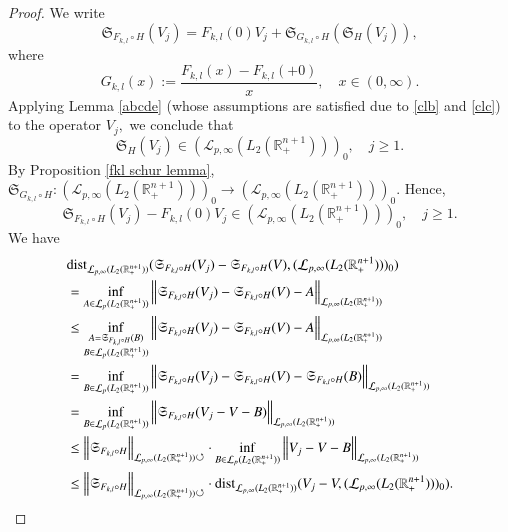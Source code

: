 \documentclass[12pt]{amsart}
\begin{document}
\begin{proof} We write
$$\mathfrak{S}_{F_{k,l}\circ H}(V_j)=F_{k,l}(0)V_j+\mathfrak{S}_{G_{k,l}\circ H}(\mathfrak{S}_H(V_j)),$$
where
$$G_{k,l}(x):=\frac{F_{k,l}(x)-F_{k,l}(+0)}{x},\quad x\in(0,\infty).$$
Applying Lemma \ref{abcde} (whose assumptions are satisfied due to \eqref{clb} and \eqref{clc}) to the operator $V_j,$ we conclude that
$$\mathfrak{S}_H(V_j)\in (\mathcal{L}_{p,\infty}(L_2(\mathbb{R}^{n+1}_+)))_0,\quad j\geq 1.$$
By Proposition \ref{fkl schur lemma}, $\mathfrak{S}_{G_{k,l}\circ H}:(\mathcal{L}_{p,\infty}(L_2(\mathbb{R}^{n+1}_+)))_0\to (\mathcal{L}_{p,\infty}(L_2(\mathbb{R}^{n+1}_+)))_0.$  Hence,
\begin{equation}\label{cl eq0}
\mathfrak{S}_{F_{k,l}\circ H}(V_j)-F_{k,l}(0)V_j\in (\mathcal{L}_{p,\infty}(L_2(\mathbb{R}^{n+1}_+)))_0,\quad j\geq 1.
\end{equation}
We have
\begin{align*}
&{\rm dist}_{\mathcal{L}_{p,\infty}(L_2(\mathbb{R}^{n+1}_+))}(\mathfrak{S}_{F_{k,l}\circ H}(V_j)-\mathfrak{S}_{F_{k,l}\circ H}(V),(\mathcal{L}_{p,\infty}(L_2(\mathbb{R}^{n+1}_+)))_0)\\
&=\inf_{A\in \mathcal{L}_p(L_2(\mathbb{R}^{n+1}_+))}\Big\|\mathfrak{S}_{F_{k,l}\circ H}(V_j)-\mathfrak{S}_{F_{k,l}\circ H}(V)-A\Big\|_{\mathcal{L}_{p,\infty}(L_2(\mathbb{R}^{n+1}_+))}\\
&\leq\inf_{\substack{A=\mathfrak{S}_{F_{k,l}\circ H}(B)\\ B\in \mathcal{L}_p(L_2(\mathbb{R}^{n+1}_+))}}\Big\|\mathfrak{S}_{F_{k,l}\circ H}(V_j)-\mathfrak{S}_{F_{k,l}\circ H}(V)-A\Big\|_{\mathcal{L}_{p,\infty}(L_2(\mathbb{R}^{n+1}_+))}\\
&=\inf_{B\in \mathcal{L}_p(L_2(\mathbb{R}^{n+1}_+))}\Big\|\mathfrak{S}_{F_{k,l}\circ H}(V_j)-\mathfrak{S}_{F_{k,l}\circ H}(V)-\mathfrak{S}_{F_{k,l}\circ H}(B)\Big\|_{\mathcal{L}_{p,\infty}(L_2(\mathbb{R}^{n+1}_+))}\\
&=\inf_{B\in \mathcal{L}_p(L_2(\mathbb{R}^{n+1}_+))}\Big\|\mathfrak{S}_{F_{k,l}\circ H}(V_j-V-B)\Big\|_{\mathcal{L}_{p,\infty}(L_2(\mathbb{R}^{n+1}_+))}\\
&\leq\Big\|\mathfrak{S}_{F_{k,l}\circ H}\Big\|_{\mathcal{L}_{p,\infty}(L_2(\mathbb{R}^{n+1}_+))\circlearrowleft}\cdot\inf_{B\in \mathcal{L}_p(L_2(\mathbb{R}^{n+1}_+))}\Big\|V_j-V-B\Big\|_{\mathcal{L}_{p,\infty}(L_2(\mathbb{R}^{n+1}_+))}\\
&\leq\Big\|\mathfrak{S}_{F_{k,l}\circ H}\Big\|_{\mathcal{L}_{p,\infty}(L_2(\mathbb{R}^{n+1}_+))\circlearrowleft}\cdot{\rm dist}_{\mathcal{L}_{p,\infty}(L_2(\mathbb{R}^{n+1}_+))}(V_j-V,(\mathcal{L}_{p,\infty}(L_2(\mathbb{R}^{n+1}_+)))_0).

\end{align*}
\end{proof}
\end{document}
